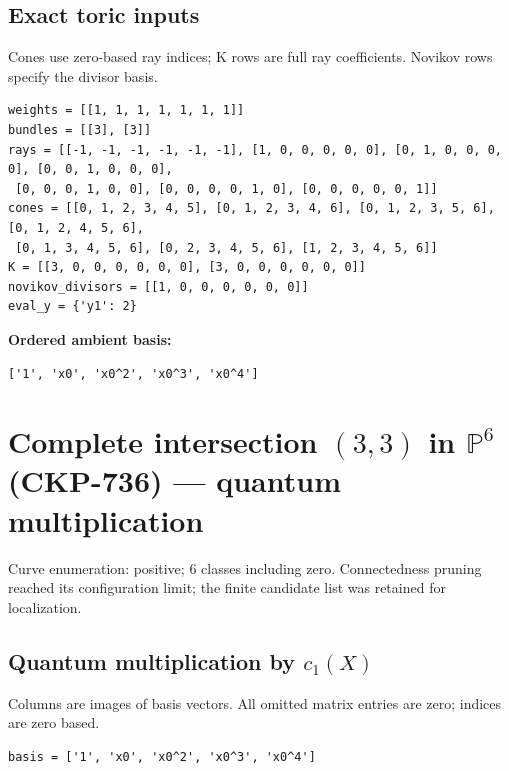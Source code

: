 \documentclass[10pt,a4paper]{article}
\begin{document}
\subsection*{Exact toric inputs}
Cones use zero-based ray indices; K rows are full ray coefficients. Novikov rows specify the divisor basis.

\begin{lstlisting}
weights = [[1, 1, 1, 1, 1, 1, 1]]
bundles = [[3], [3]]
rays = [[-1, -1, -1, -1, -1, -1], [1, 0, 0, 0, 0, 0], [0, 1, 0, 0, 0, 0], [0, 0, 1, 0, 0, 0],
 [0, 0, 0, 1, 0, 0], [0, 0, 0, 0, 1, 0], [0, 0, 0, 0, 0, 1]]
cones = [[0, 1, 2, 3, 4, 5], [0, 1, 2, 3, 4, 6], [0, 1, 2, 3, 5, 6], [0, 1, 2, 4, 5, 6],
 [0, 1, 3, 4, 5, 6], [0, 2, 3, 4, 5, 6], [1, 2, 3, 4, 5, 6]]
K = [[3, 0, 0, 0, 0, 0, 0], [3, 0, 0, 0, 0, 0, 0]]
novikov_divisors = [[1, 0, 0, 0, 0, 0, 0]]
eval_y = {'y1': 2}
\end{lstlisting}

\textbf{Ordered ambient basis:}
\begin{lstlisting}
['1', 'x0', 'x0^2', 'x0^3', 'x0^4']
\end{lstlisting}

\clearpage\section*{Complete intersection $(3,3)$ in $\mathbb P^{6}$ (CKP-736) --- quantum multiplication}

Curve enumeration: positive; 6 classes including zero.
Connectedness pruning reached its configuration limit; the finite candidate list was retained for localization.
\subsection*{Quantum multiplication by $c_1(X)$}
Columns are images of basis vectors. All omitted matrix entries are zero; indices are zero based.

\begin{lstlisting}
basis = ['1', 'x0', 'x0^2', 'x0^3', 'x0^4']
\end{lstlisting}
\end{document}

